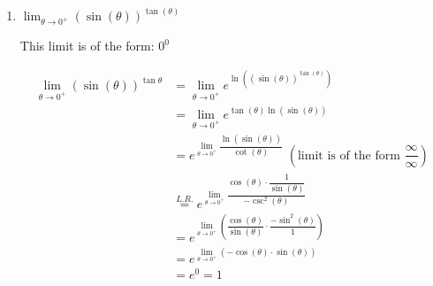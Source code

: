 \documentclass{ximera}
\begin{document}
\begin{problem}
\begin{enumerate}
    
    \item $\displaystyle \lim_{\theta \to 0^+} \left(\sin(\theta)\right)^{\tan(\theta)}$
        \begin{explanation}
    This limit is of the form: $0^0$
    
     \begin{align*}
        \displaystyle \lim_{\theta \to 0^+} \left(\sin(\theta)\right)^{\tan\theta} &= \displaystyle \lim_{\theta \to 0^+} e^{\ln \left((\sin(\theta))^{\tan(\theta)} \right) } \\
                                            &= \displaystyle \lim_{\theta \to 0^+} e^{\tan(\theta) \ln (\sin(\theta)) } \\
                                            &= e^{ \displaystyle \lim_{\theta \to 0^+} \dfrac{\ln (\sin(\theta))}{\cot(\theta)} } \; \left( \text{limit is of the form } \dfrac{\infty}{\infty} \right) \\
                                            &\stackrel{L.R.}{=} e^{\displaystyle \lim_{\theta \to 0^+}\dfrac{\cos(\theta) \cdot \dfrac{1}{\sin(\theta)}}{-\csc^2(\theta)}} \\
                                            &= e^{\displaystyle \lim_{\theta \to 0^+} \left(\dfrac{\cos(\theta)}{\sin(\theta)}\cdot\dfrac{-\sin^2(\theta)}{1}\right)} \\
                                              &= e^{\displaystyle \lim_{\theta \to 0^+} (-\cos(\theta)\cdot\sin(\theta))} \\
                                            &= e^0=1
        \end{align*}
    \end{explanation}
    

    
  \end{enumerate}
\end{problem}
\end{document}
